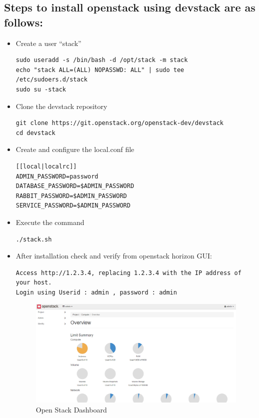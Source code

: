\subsection{Steps to install openstack using devstack are as follows:}
\begin{itemize}
\item Create a user “stack”
\begin{lstlisting}
sudo useradd -s /bin/bash -d /opt/stack -m stack
echo "stack ALL=(ALL) NOPASSWD: ALL" | sudo tee /etc/sudoers.d/stack
sudo su -stack
\end{lstlisting}
\item Clone the devstack repository
\begin{lstlisting}
git clone https://git.openstack.org/openstack-dev/devstack
cd devstack
\end{lstlisting}
\item Create and configure the local.conf file
\begin{lstlisting}
[[local|localrc]]
ADMIN_PASSWORD=password
DATABASE_PASSWORD=$ADMIN_PASSWORD
RABBIT_PASSWORD=$ADMIN_PASSWORD
SERVICE_PASSWORD=$ADMIN_PASSWORD
\end{lstlisting}
\item Execute the command
\begin{lstlisting}
./stack.sh
\end{lstlisting}
\item After installation check and verify from openstack horizon GUI:
\begin{lstlisting}
Access http://1.2.3.4, replacing 1.2.3.4 with the IP address of your host.
Login using Userid : admin , password : admin
\end{lstlisting}
\begin{figure} [H]
	\centering
	\includegraphics[width=0.5\linewidth]{figures/sh2}
	\caption{Open Stack Dashboard}
\end{figure}
\end{itemize}
